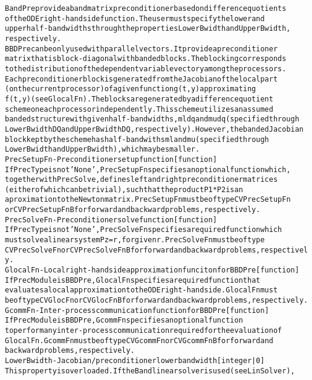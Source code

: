 \begin{alltt}
     BandPre provide a band matrix preconditioner based on difference quotients
   of the ODE right-hand side function. The user must specify the lower and
   upper half-bandwidths through the properties LowerBwidth and UpperBwidth,
   respectively.
     BBDPre can be only used with parallel vectors. It provide a preconditioner
   matrix that is block-diagonal with banded blocks. The blocking corresponds
   to the distribution of the dependent variable vector y among the processors.
   Each preconditioner block is generated from the Jacobian of the local part
   (on the current processor) of a given function g(t,y) approximating
   f(t,y) (see GlocalFn). The blocks are generated by a difference quotient
   scheme on each processor independently. This scheme utilizes an assumed
   banded structure with given half-bandwidths, mldq and mudq (specified through
   LowerBwidthDQ and UpperBwidthDQ, respectively). However, the banded Jacobian
   block kept by the scheme has half-bandwiths ml and mu (specified through
   LowerBwidth and UpperBwidth), which may be smaller.
PrecSetupFn - Preconditioner setup function [ function ]
   If PrecType is not 'None', PrecSetupFn specifies an optional function which,
   together with PrecSolve, defines left and right preconditioner matrices
   (either of which can be trivial), such that the product P1*P2 is an
   aproximation to the Newton matrix. PrecSetupFn must be of type CVPrecSetupFn
   or CVPrecSetupFnB for forward and backward problems, respectively.
PrecSolveFn - Preconditioner solve function [ function ]
   If PrecType is not 'None', PrecSolveFn specifies a required function which
   must solve a linear system Pz = r, for given r. PrecSolveFn must be of type
   CVPrecSolveFn or CVPrecSolveFnB for forward and backward problems, respectively.
GlocalFn - Local right-hand side approximation funciton for BBDPre [ function ]
   If PrecModule is BBDPre, GlocalFn specifies a required function that
   evaluates a local approximation to the ODE right-hand side. GlocalFn must
   be of type CVGlocFn or CVGlocFnB for forward and backward problems, respectively.
GcommFn - Inter-process communication function for BBDPre [ function ]
   If PrecModule is BBDPre, GcommFn specifies an optional function
   to perform any inter-process communication required for the evaluation of
   GlocalFn. GcommFn must be of type CVGcommFn or CVGcommFnB  for forward and
   backward problems, respectively.
LowerBwidth - Jacobian/preconditioner lower bandwidth [ integer | {0} ]
   This property is overloaded. If the Band linear solver is used (see LinSolver),

\end{alltt}
